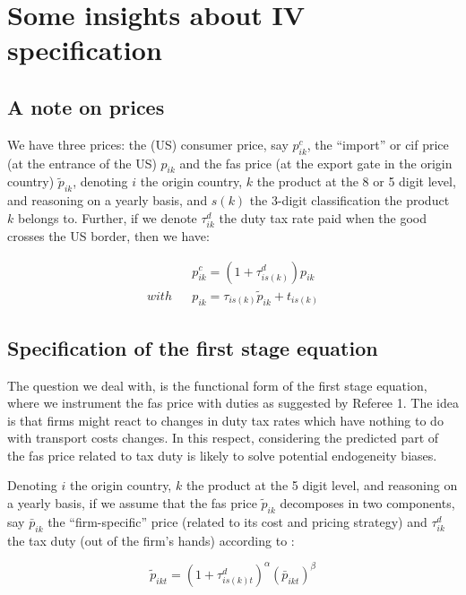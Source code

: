 \documentclass[11pt,twoside, authoryear]{elsarticle}
\begin{document}
\section{Some insights about IV specification}

\subsection{A note on prices}

We have three prices: the (US) consumer price, say $p^{c}_{ik}$, the ``import'' or  cif price (at the entrance of the US) $p_{ik}$ and the fas price (at the export gate in the origin country) $\widetilde{p}_{ik}$, denoting $i$ the origin country, $k$ the product at the 8 or 5 digit level, and reasoning on a yearly basis, and $s(k)$ the 3-digit classification the product $k$ belongs to. Further, if we denote $\tau^d_{ik}$ the duty tax rate paid when the good crosses the US border, then we have:

\begin{eqnarray*}
&&p^c_{ik} = (1+\tau^d_{is(k)})p_{ik} \\
with && p_{ik}  = \tau_{is(k)} \widetilde{p}_{ik} +t_{is(k)}
\end{eqnarray*}



\subsection{Specification of the first stage equation}


The question we deal with, is the functional form of the first stage equation, where we instrument the fas price with duties as suggested by Referee 1. The idea is that firms might react to changes in duty tax rates which have nothing to do with transport costs changes. In this respect, considering the predicted part of the fas price related to tax duty is likely to solve potential endogeneity biases.

Denoting $i$ the origin country, $k$ the product at the 5 digit level, and reasoning on a yearly basis, if we assume that the fas price $\widetilde{p}_{ik}$ decomposes in two components, say $\bar{p}_{ik}$ the ``firm-specific'' price (related to its cost and pricing strategy) and $\tau^d_{ik}$ the tax duty (out of the firm's hands) according to :

\begin{equation}
\widetilde{p}_{ikt} = (1+\tau^d_{is(k)t})^\alpha \left(\bar{p}_{ikt}\right)^\beta \label{eq:link_fas_duty}
\end{equation}
\end{document}
